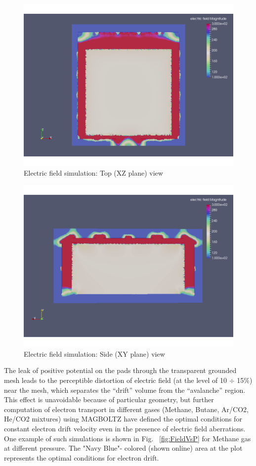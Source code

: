 \documentclass[final,number,sort&compress,5p,times,twocolumn]{elsarticle}
\begin{document}
\begin{figure}[hbt!]
    \centering
 \includegraphics[width=1.0\columnwidth]{Figs/FieldXZ}	
    \caption{Electric field simulation: Top  (XZ plane)  view}
     \label{fig:FieldXZ} 
\end{figure}
		
		
\begin{figure}[hbt!]
    \centering
 \includegraphics[width=1.0\columnwidth]{Figs/FieldXY}	
    \caption{Electric field simulation: Side (XY plane) view}
     \label{fig:FieldXY} 
\end{figure}
	
The leak of positive potential on the pads through the transparent grounded mesh leads to the perceptible distortion of electric field (at the level of 10 $\div$ 15$\%$) near the mesh, which separates the ``drift'' volume from the ``avalanche'' region. This effect is unavoidable because of particular geometry, but further computation of electron transport in different gases (Methane, Butane, Ar/CO2, He/CO2 mixtures) using MAGBOLTZ \cite{MAGBOLTZ} have defined the optimal conditions for constant electron drift velocity even in the presence of electric field aberrations.  One example of such simulations is shown in Fig. ~\ref{fig:FieldVsP} for Methane gas at different pressure.  The "Navy Blue"- colored (shown online) area at the plot represents the optimal conditions for electron drift.
 
\end{document}

